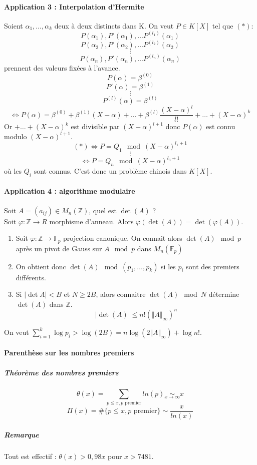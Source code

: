 \documentclass[12pt,a4paper]{report}
\begin{document}
\paragraph{Application 3 : Interpolation d'Hermite\\}
Soient $\alpha_1,\ldots,\alpha_k$ deux à deux distincts dans K. On veut $P\in K[X]$ tel que $(*)$:
$$ P(\alpha_1), P'(\alpha_1), \ldots P^{(l_1)}(\alpha_1) $$
$$ P(\alpha_2), P'(\alpha_2), \ldots P^{(l_2)}(\alpha_2) $$
$$ \vdots $$
$$ P(\alpha_n), P'(\alpha_n), \ldots P^{(l_n)}(\alpha_n) $$
prennent des valeurs fixées à l'avance.
$$P(\alpha) = \beta^{(0)} $$
$$P'(\alpha) = \beta^{(1)} $$
$$ \vdots $$
$$ P^{(l)}(\alpha)= \beta^{(l)} $$
$$\Longleftrightarrow P(\alpha) = \beta^{(0)} + \beta^{(1)}(X-\alpha) + \ldots + \beta^{(l)} \frac{(X-\alpha)^l}{l!} + \dots + (X-\alpha)^k$$
Or $ + \dots + (X-\alpha)^k $ est divisible par $(X-\alpha)^{l+1}$ donc $P(\alpha)$ est connu modulo $(X-\alpha)^{l+1}$.\\
$$ (*) \Leftrightarrow P = Q_1 \mod (X-\alpha)^{l_1+1}$$
$$ \vdots $$
$$ \Longleftrightarrow P = Q_n \mod (X-\alpha)^{l_n+1}$$
où les $Q_i$ sont connus.
C'est donc un problème chinois dans $K[X]$.
\paragraph{Application 4 : algorithme modulaire\\}
Soit $ A=(a_{ij}) \in M_n(\mathbb{Z})$, quel est $ \det(A)$ ?\\
Soit $ \varphi : \mathbb{Z} \longrightarrow R$ morphisme d'anneau. Alors $\varphi(\det(A))=\det(\varphi(A))$.
\begin{enumerate}
\item Soit $ \varphi : \mathbb{Z} \longrightarrow \mathbb{F}_p$ projection canonique. On connait alors $\det(A) \mod p$ après un pivot de Gauss sur $A \mod p$ dans $ M_n(\mathbb{F}_p)$
\item On obtient donc $ \det(A) \mod (p_1,\ldots,p_k)$ si les $p_i$ sont des premiers différents.
\item Si $|\det A| < B$ et $ N \geqslant 2B$, alors connaitre $\det(A) \mod N$ détermine $\det(A)$ dans $\mathbb{Z}$.
$$ |\det(A)| \leqslant n!(\Vert A \Vert_{\infty})^n $$
\end{enumerate}
On veut $\displaystyle \sum_{i=1}^k \log p_i > \log(2B) = n \log(2 \Vert A \Vert_{\infty})+ \log n!$.
\paragraph{Parenthèse sur les nombres premiers\\}
\subparagraph{Théorème des nombres premiers\\}
 $$ \theta (x)= \sum_{p\leqslant x, p\mbox{ premier}} ln(p) \underset{x \rightarrow \infty}{\sim} x $$
 $$ \Pi(x) = \#\{p\leqslant x, p \mbox{ premier}\} \sim \frac{x}{ln(x)} $$
  \subparagraph{Remarque\\}
  Tout est effectif : $\theta(x) > 0,98 x$ pour $x >7481$.\\
  
\end{document}
